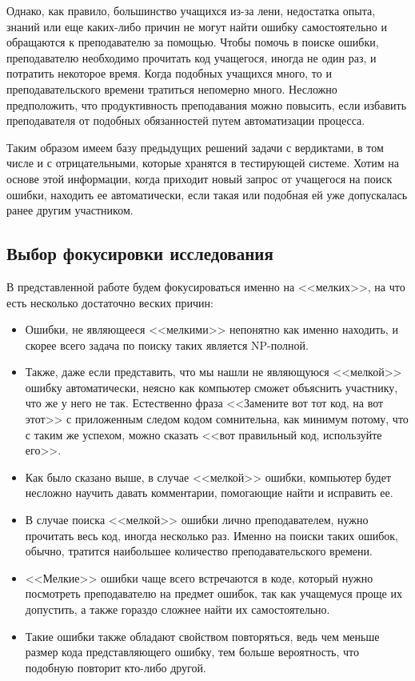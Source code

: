 Однако, как правило, большинство учащихся из-за лени, недостатка опыта, знаний или еще каких-либо причин не могут найти ошибку
самостоятельно и обращаются к преподавателю за помощью. Чтобы помочь в поиске ошибки, преподавателю необходимо прочитать код учащегося,
иногда не один раз, и потратить некоторое время. Когда подобных учащихся много, то и преподавательского времени тратиться 
непомерно много. Несложно предположить, что продуктивность преподавания можно повысить, если избавить преподавателя от 
подобных обязанностей путем автоматизации процесса.

Таким образом имеем базу предыдущих решений задачи с вердиктами, в том числе и с отрицательными, которые хранятся в 
тестирующей системе. Хотим на основе этой информации, когда приходит новый запрос от учащегося на поиск ошибки, 
находить ее автоматически, если такая или подобная ей уже допускалась ранее другим участником. 

\subsection{Выбор фокусировки исследования}
В представленной работе будем фокусироваться именно на <<мелких>>, на что есть несколько достаточно веских причин:
\begin{itemize}
    \item Ошибки, не являющееся <<мелкими>> непонятно как именно находить, и скорее всего задача по поиску таких
        является NP-полной.
    \item Также, даже если представить, что мы нашли не являющуюся <<мелкой>> ошибку автоматически, неясно как
        компьютер сможет объяснить участнику, что же у него не так. Естественно фраза <<Замените вот тот код, на вот этот>>
        с приложенным следом кодом сомнительна, как минимум потому, что с таким же успехом, можно сказать <<вот правильный
        код, используйте его>>.
    \item Как было сказано выше, в случае <<мелкой>> ошибки, компьютер будет несложно научить давать комментарии, помогающие
        найти и исправить ее. 
    \item В случае поиска <<мелкой>> ошибки лично преподавателем, нужно прочитать
        весь код, иногда несколько раз. Именно на поиски таких ошибок, обычно, тратится наибольшее количество
        преподавательского времени.
    \item <<Мелкие>> ошибки чаще всего встречаются в коде, который нужно посмотреть преподавателю на предмет ошибок, 
        так как учащемуся проще их допустить, а также гораздо сложнее найти их самостоятельно.
    \item Такие ошибки также обладают свойством повторяться, ведь чем меньше размер кода представляющего ошибку, 
        тем больше вероятность, что подобную повторит кто-либо другой.
\end{itemize}

